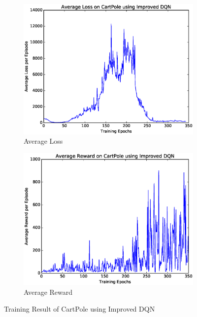 \documentclass[a4paper,UTF8]{article}
\theoremstyle{definition}
\begin{document}
\begin{figure}[H]
	\centering
	\begin{subfigure}[t]{0.5\textwidth}
		\centering
		\includegraphics[scale=0.35]{figures/pole-idqn-loss}
		\caption{Average Loss}
	\end{subfigure}%
	\begin{subfigure}[t]{0.5\textwidth}
		\centering
		\includegraphics[scale=0.35]{figures/pole-idqn-reward}
		\caption{Average Reward}
	\end{subfigure}
	\caption{Training Result of CartPole using Improved DQN}\label{fig:pole-idqn}
\end{figure}
\end{document}
